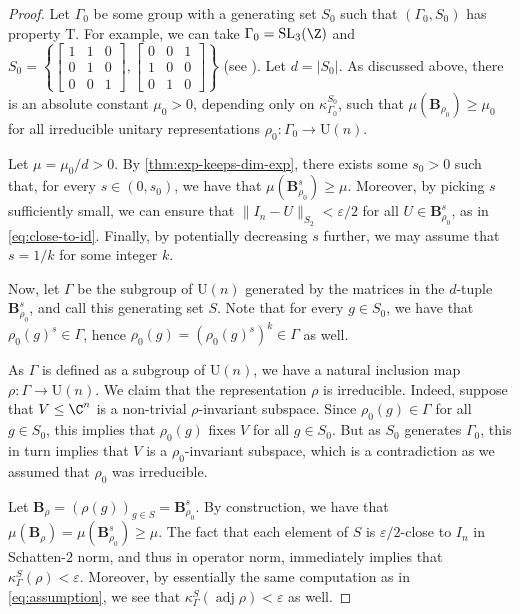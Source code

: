 \documentclass{toc}
\theoremstyle{plain}
\numberwithin{equation}{section}
\theoremstyle{definition}
\DeclareMathOperator\adj{adj}
\newcommand{\SL}{\mathrm{SL}}
\newcommand{\norm}[1]{\lVert#1\rVert}
\newcommand{\ab}[1]{\left\lvert#1\right\rvert}
\newcommand{\U}{\mathrm{U}}
\newcommand{\tuple}[1]{\mathbf{#1}}
\newcommand{\vB}{\tuple{B}}
\newcommand\smat[1]{\left[\begin{smallmatrix}#1\end{smallmatrix}\right]}
\begin{document}
\begin{proof}
    Let $\Gamma_0$ be some group with a generating set $S_0$ such that $(\Gamma_0,S_0)$ has property T. For example, we can take $\Gamma_0=\SL_3(\Z)$ and $S_0=\left\{ \smat{1&1&0\\0&1&0\\0&0&1}, \smat{0&0&1\\1&0&0\\0&1&0}\right\}$ (see \cite[Example 3.I]{LUBOTZKY2008730}). Let $d=\ab {S_0}$. As discussed above, there is an absolute constant $\mu_0>0$, depending only on $\kappa_{\Gamma_0}^{S_0}$, such that $\mu(\vB_{\rho_0})\geq \mu_0$ for all irreducible unitary representations ${\rho_0}:\Gamma_0 \to \U(n)$. 

    Let $\mu=\mu_0/d >0$. By \cref{thm:exp-keeps-dim-exp}, there exists some $s_0>0$ such that, for every $s \in (0,s_0)$, we have that $\mu(\vB_{\rho_0}^s)\geq\mu$. Moreover, by picking $s$ sufficiently small, we can ensure that $\norm{I_n-U}_{S_2}<\varepsilon/2$ for all $U \in \vB_{\rho_0}^s$, as in \eqref{eq:close-to-id}. Finally, by potentially decreasing $s$ further, we may assume that $s=1/k$ for some integer $k$.

    Now, let $\Gamma$ be the subgroup of $\U(n)$ generated by the matrices in the $d$-tuple $\vB_{\rho_0}^s$, and call this generating set $S$. 
    Note that for every $g \in S_0$, we have that $\rho_0(g)^s \in \Gamma$, hence $\rho_0(g) = (\rho_0(g)^s)^k \in \Gamma$ as well. 

    As $\Gamma$ is defined as a subgroup of $\U(n)$, we have a natural inclusion map $\rho:\Gamma \to \U(n)$. 
    We claim that the representation $\rho$ is irreducible. Indeed, suppose that $V \leq \C^n$ is a non-trivial $\rho$-invariant subspace. Since $\rho_0(g) \in \Gamma$ for all $g \in S_0$, this implies that $\rho_0(g)$ fixes $V$ for all $g \in S_0$. But as $S_0$ generates $\Gamma_0$, this in turn implies that $V$ is a $\rho_0$-invariant subspace, which is a contradiction as we assumed that $\rho_0$ was irreducible.

    Let $\vB_\rho=(\rho(g))_{g\in S}=\vB_{\rho_0}^s$.
    By construction, we have that $\mu(\vB_\rho)=\mu(\vB_{\rho_0}^s)\geq \mu$. The fact that each element of $S$ is $\varepsilon/2$-close to $I_n$ in Schatten-$2$ norm, and thus in operator norm, immediately implies that $\kappa_\Gamma^S(\rho)<\varepsilon$. Moreover, by essentially the same computation as in \eqref{eq:assumption}, we see that $\kappa_\Gamma^S(\adj \rho)<\varepsilon$ as well.
\end{proof}
\end{document}
